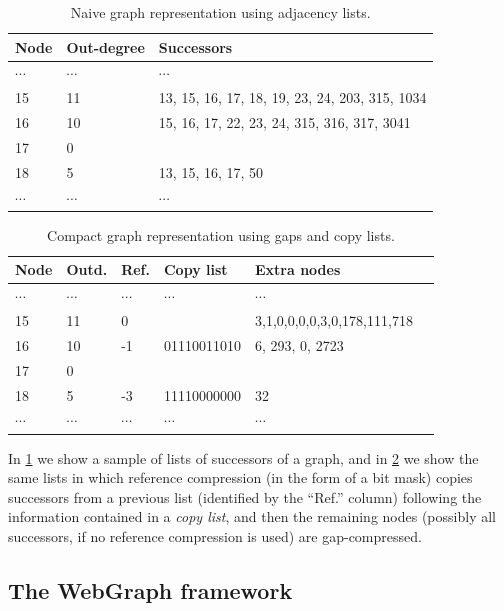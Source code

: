\begin{table}
  \centering
  \caption{Naive graph representation using adjacency lists.}%
  \label{tab:compression-naive}
  \begin{tabular}{|l|l|l|}
    \hline
    \textbf{Node} & \textbf{Out-degree} & \textbf{Successors} \\
    \hline
    $\cdots$ & $\cdots$ & $\cdots$\\
    15 & 11 & 13, 15, 16, 17, 18, 19, 23, 24, 203, 315, 1034\\
    16 & 10 & 15, 16, 17, 22, 23, 24, 315, 316, 317, 3041\\
    17 & 0 & \\
    18 & 5 & 13, 15, 16, 17, 50\\
    $\cdots$ & $\cdots$ & $\cdots$
  \end{tabular}
\end{table}

\begin{table}
  \centering
  \caption{Compact graph representation using gaps and copy lists.}%
  \label{tab:compression-copy}
  \begin{tabular}{|l|l|l|l|l|l}
    \hline
    \textbf{Node}
    & \textbf{Outd.}
    & \textbf{Ref.}
    & \textbf{Copy list}
    & \textbf{Extra nodes}
    \\
    \hline
    $\cdots$ & $\cdots$ & $\cdots$ & $\cdots$ & $\cdots$ \\
    15 & 11 & 0 & & 3,1,0,0,0,0,3,0,178,111,718 \\
    16 & 10 & -1 & 01110011010 & 6, 293, 0, 2723 \\
    17 & 0 & & & \\
    18 & 5  & -3 & 11110000000 & 32 \\
    $\cdots$ & $\cdots$ & $\cdots$ & $\cdots$ & $\cdots$  
  \end{tabular}
\end{table}

In \cref{tab:compression-naive} we show a sample of lists of successors of
a graph, and in \cref{tab:compression-copy} we show the same lists in
which reference compression (in the form of a bit mask) copies successors from
a previous list (identified by the ``Ref.'' column) following the information
contained in a \emph{copy list}, and then the remaining nodes (possibly all
successors, if no reference compression is used) are gap-compressed.

\subsection{The WebGraph framework}

